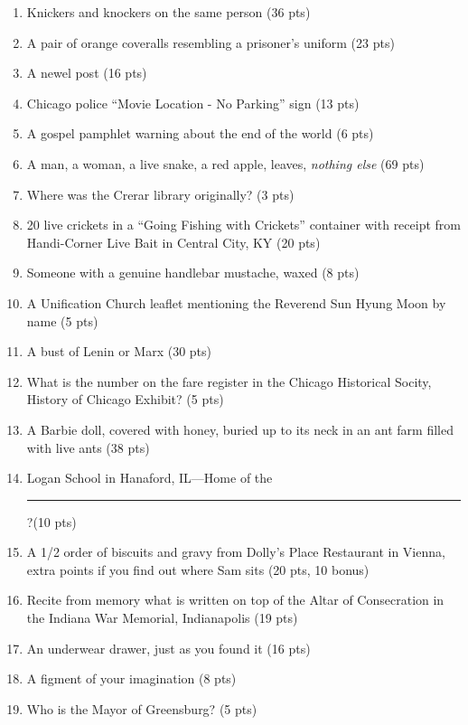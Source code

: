 \begin{enumerate}
\item Knickers and knockers on the same person (36 pts)
\item A pair of orange coveralls resembling a prisoner's uniform (23 pts)
\item A newel post (16 pts)
\item Chicago police ``Movie Location - No Parking'' sign (13 pts)
\item A gospel pamphlet warning about the end of the world (6 pts)
\item A man, a woman, a live snake, a red apple, leaves, {\it nothing else} (69 pts)
\item Where was the Crerar library originally? (3 pts)
\item 20 live crickets in a ``Going Fishing with Crickets'' container with receipt from Handi-Corner Live Bait in Central City, KY (20 pts)
\item Someone with a genuine handlebar mustache, waxed (8 pts)
\item A Unification Church leaflet mentioning the Reverend Sun Hyung Moon by name (5 pts)
\item A bust of Lenin or Marx (30 pts)
\item What is the number on the fare register in the Chicago Historical Socity, History of Chicago Exhibit? (5 pts)
\item A Barbie{\texttrademark} doll, covered with honey, buried up to its neck in an ant farm filled with live ants (38 pts)
\item Logan School in Hanaford, IL---Home of the \rule{.5in}{.01in}?(10 pts)
\item A 1/2 order of biscuits and gravy from Dolly's Place Restaurant in Vienna, extra points if you find out where Sam sits (20 pts, 10 bonus)
\item Recite from memory what is written on top of the Altar of Consecration in the Indiana War Memorial, Indianapolis (19 pts)
\item An underwear drawer, just as you found it (16 pts)
\item A figment of  your imagination (8 pts)
\item Who is the Mayor of Greensburg? (5 pts)


\end{enumerate}
